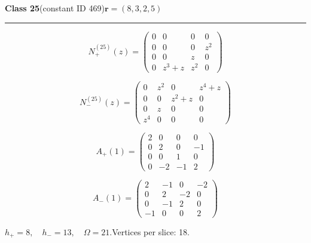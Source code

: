 \noindent\begin{minipage}{\linewidth}
\noindent\textbf{Class 25}\quad\small (constant ID 469)\hfill $\symbf{r}=(8,3,2,5)$
\par\smallskip\noindent\textcolor{rulegray}{\rule{\linewidth}{0.3pt}}
\begin{minipage}[c]{0.495\linewidth}\centering\fontsize{9.7}{12}\selectfont
\setlength{\abovedisplayskip}{4pt}\setlength{\belowdisplayskip}{4pt}
\setlength{\abovedisplayshortskip}{4pt}\setlength{\belowdisplayshortskip}{4pt}
\setlength{\arraycolsep}{3pt}\renewcommand{\arraystretch}{1.08}
\[N_{+}^{(25)}(z)=\begin{pmatrix}0 & 0 & 0 & 0\\0 & 0 & 0 & z^{2}\\0 & 0 & z & 0\\0 & z^{3} + z & z^{2} & 0\end{pmatrix}\]
\end{minipage}%
\begin{minipage}[c]{0.495\linewidth}\centering\fontsize{9.7}{12}\selectfont
\setlength{\abovedisplayskip}{4pt}\setlength{\belowdisplayskip}{4pt}
\setlength{\abovedisplayshortskip}{4pt}\setlength{\belowdisplayshortskip}{4pt}
\setlength{\arraycolsep}{3pt}\renewcommand{\arraystretch}{1.08}
\[N_{-}^{(25)}(z)=\begin{pmatrix}0 & z^{2} & 0 & z^{4} + z\\0 & 0 & z^{2} + z & 0\\0 & z & 0 & 0\\z^{4} & 0 & 0 & 0\end{pmatrix}\]
\end{minipage}%
\par\noindent
\begin{minipage}[c]{0.495\linewidth}\centering\fontsize{9.7}{12}\selectfont
\setlength{\abovedisplayskip}{4pt}\setlength{\belowdisplayskip}{4pt}
\setlength{\abovedisplayshortskip}{4pt}\setlength{\belowdisplayshortskip}{4pt}
\setlength{\arraycolsep}{3pt}\renewcommand{\arraystretch}{1.08}
\[A_{+}(1)=\begin{pmatrix}2 & 0 & 0 & 0\\0 & 2 & 0 & -1\\0 & 0 & 1 & 0\\0 & -2 & -1 & 2\end{pmatrix}\]
\end{minipage}%
\begin{minipage}[c]{0.495\linewidth}\centering\fontsize{9.7}{12}\selectfont
\setlength{\abovedisplayskip}{4pt}\setlength{\belowdisplayskip}{4pt}
\setlength{\abovedisplayshortskip}{4pt}\setlength{\belowdisplayshortskip}{4pt}
\setlength{\arraycolsep}{3pt}\renewcommand{\arraystretch}{1.08}
\[A_{-}(1)=\begin{pmatrix}2 & -1 & 0 & -2\\0 & 2 & -2 & 0\\0 & -1 & 2 & 0\\-1 & 0 & 0 & 2\end{pmatrix}\]
\end{minipage}%
\par\smallskip\noindent\small $h_+=8,\quad h_-=13,\quad \Omega=21.$\quad Vertices per slice: 18.
\end{minipage}\par\vfill
